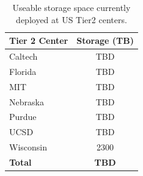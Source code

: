 \documentclass[11pt,a4paper]{article}
\begin{document}
\begin{table}
\begin{center}
\begin{tabular}{|l|c|}
\hline
{\bf Tier 2 Center}                         & {\bf Storage (TB)} \\ \hline
Caltech                                         & TBD \\
Florida                                          & TBD \\
MIT                                               & TBD \\
Nebraska                                      & TBD \\
Purdue                                          & TBD \\
UCSD                                           & TBD \\ 
Wisconsin                                     & 2300 \\ \hline
{\bf Total}                                       & {\bf TBD} \\ \hline
\end{tabular}
\caption[]
{
Useable storage space currently deployed at US Tier2 centers.
}
\label{storage-resources}
\end{center}
\end{table}
\end{document}

